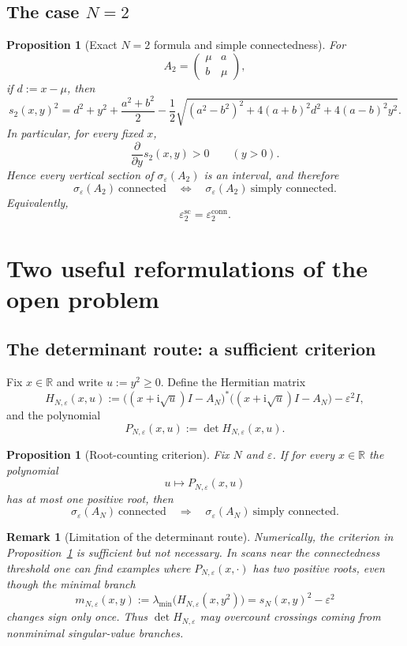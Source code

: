 \documentclass[11pt]{article}
\newtheorem{proposition}[theorem]{Proposition}
\newtheorem{remark}[theorem]{Remark}
\newcommand{\R}{\mathbb{R}}
\newcommand{\eps}{\varepsilon}
\newcommand{\sig}{\sigma}
\newcommand{\conn}{\mathrm{conn}}
\newcommand{\scn}{\mathrm{sc}}
\newcommand{\I}{\mathrm{i}}
\begin{document}
\subsection{The case \texorpdfstring{\(N=2\)}{N=2}}

\begin{proposition}[Exact \(N=2\) formula and simple connectedness]
\label{prop:N2}
For
\[
A_2=
\begin{pmatrix}
\mu & a\\
b & \mu
\end{pmatrix},
\]
if $d:=x-\mu$, then
\[
s_2(x,y)^2
=
d^2+y^2+\frac{a^2+b^2}{2}
-\frac12\sqrt{(a^2-b^2)^2+4(a+b)^2d^2+4(a-b)^2y^2}.
\]
In particular, for every fixed $x$,
\[
\frac{\partial}{\partial y}s_2(x,y)>0
\qquad (y>0).
\]
Hence every vertical section of $\sig_\eps(A_2)$ is an interval, and therefore
\[
\sig_\eps(A_2)\ \text{connected}
\quad\Longleftrightarrow\quad
\sig_\eps(A_2)\ \text{simply connected}.
\]
Equivalently,
\[
\eps_2^{\scn}=\eps_2^{\conn}.
\]
\end{proposition}

\section{Two useful reformulations of the open problem}

\subsection{The determinant route: a sufficient criterion}

Fix $x\in\R$ and write $u:=y^2\ge 0$. Define the Hermitian matrix
\[
H_{N,\eps}(x,u)
:=
\bigl((x+\I\sqrt u)I-A_N\bigr)^*
\bigl((x+\I\sqrt u)I-A_N\bigr)-\eps^2I,
\]
and the polynomial
\[
P_{N,\eps}(x,u):=\det H_{N,\eps}(x,u).
\]

\begin{proposition}[Root-counting criterion]
\label{prop:det-sufficient}
Fix $N$ and $\eps$. If for every $x\in\R$ the polynomial
\[
u\longmapsto P_{N,\eps}(x,u)
\]
has at most one positive root, then
\[
\sig_\eps(A_N)\ \text{connected}
\quad\Longrightarrow\quad
\sig_\eps(A_N)\ \text{simply connected}.
\]
\end{proposition}

\begin{remark}[Limitation of the determinant route]
Numerically, the criterion in Proposition~\ref{prop:det-sufficient} is \emph{sufficient but not necessary}. In scans near the connectedness threshold one can find examples where $P_{N,\eps}(x,\cdot)$ has two positive roots, even though the minimal branch
\[
m_{N,\eps}(x,y):=\lambda_{\min}\!\bigl(H_{N,\eps}(x,y^2)\bigr)
=
s_N(x,y)^2-\eps^2
\]
changes sign only once. Thus $\det H_{N,\eps}$ may overcount crossings coming from nonminimal singular-value branches.
\end{remark}
\end{document}
